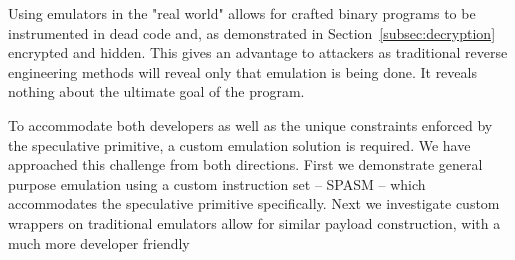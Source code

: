 Using emulators in the "real world" allows for crafted binary programs to be
instrumented in dead code and, as demonstrated in
Section~\ref{subsec:decryption} encrypted and hidden. This gives an advantage to
attackers as traditional reverse engineering methods will reveal only that
emulation is being done. It reveals nothing about the ultimate goal of the
program. 

To accommodate both developers as well as the unique constraints 
enforced by the speculative primitive, a custom emulation solution is required. We 
have approached this challenge from both directions. First we demonstrate 
general purpose emulation using a custom instruction set -- SPASM -- which
accommodates the speculative primitive specifically. Next we investigate custom 
wrappers on traditional emulators allow for similar payload construction,
with a much more developer friendly 

%   

